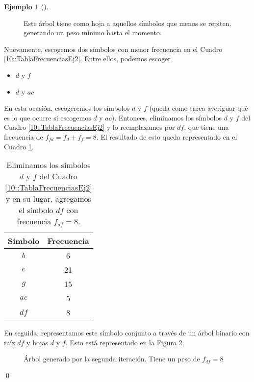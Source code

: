 \documentclass[english, spanish, fleqn, 10pt]{article}
\numberwithin{equation}{section}
\theoremstyle{definition}
\newtheorem{beforeExample}{Ejemplo}[section]
\newenvironment{ejemplo}[1][]{\begin{beforeExample}[#1]\renewcommand{\qedsymbol}{$\blacksquare$}}{\qed\end{beforeExample}}
\begin{document}
\begin{ejemplo}
\begin{figure}[!h]
		\caption{Este árbol tiene como hoja a aquellos símbolos que menos se repiten, generando un peso mínimo hasta el momento.}
		\label{10::ArbolEj1}
	\end{figure}
	
	Nuevamente, escogemos dos símbolos con menor frecuencia en el Cuadro \ref{10::TablaFrecuenciasEj2}. Entre ellos, podemos escoger
	\begin{itemize}
		\item $d$ y $f$
		\item $d$ y $ac$
	\end{itemize}
	En esta ocasión, escogeremos los símbolos $d$ y $f$ (queda como tarea averiguar qué es lo que ocurre si escogemos $d$ y $ac$). Entonces, eliminamos los símbolos $d$ y $f$ del Cuadro \ref{10::TablaFrecuenciasEj2} y lo reemplazamos por $df$, que tiene una frecuencia de $f_{fd}=f_d+f_f=8$. El resultado de esto queda representado en el Cuadro \ref{10::TablaFrecuenciasEj3}.
	\begin{table}[!h]
		\centering
		\begin{tabular}{c|c}
			Símbolo & Frecuencia\\
			\hline
			$b$&6\\
			$e$&21\\
			$g$&15\\
			$ac$&5\\
			$df$&8
		\end{tabular}
		\caption{Eliminamos los símbolos $d$ y $f$ del Cuadro \ref{10::TablaFrecuenciasEj2} y en su lugar, agregamos el símbolo $df$ con frecuencia $f_{df}=8$.}
		\label{10::TablaFrecuenciasEj3}
	\end{table}
	En seguida, representamos este símbolo conjunto a través de un árbol binario con raíz $df$ y hojas $d$ y $f$. Esto está representado en la Figura \ref{10::ArbolEj2}.
	\begin{figure}[!h]
		\centering
		\caption{Árbol generado por la segunda iteración. Tiene un peso de $f_{df}=8$}
		\label{10::ArbolEj2}
	\end{figure}
	

\end{ejemplo}
\end{document}
